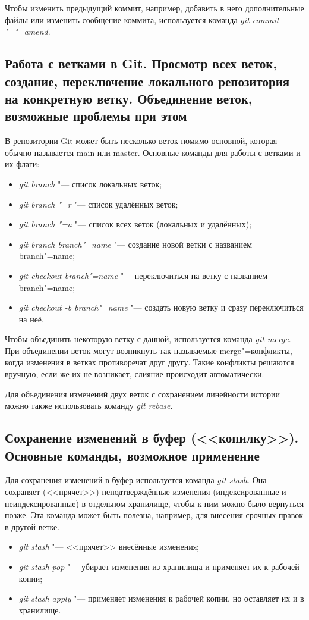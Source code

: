 \documentclass[12pt]{article}
\begin{document}
Чтобы изменить предыдущий коммит, например, добавить в него дополнительные файлы или изменить сообщение коммита, используется команда \textit{git commit "="=amend}.

\subsection{Работа с ветками в Git. Просмотр всех веток, создание, переключение локального репозитория на конкретную ветку. Объединение веток, возможные проблемы при этом}
В репозитории Git может быть несколько веток помимо основной, которая обычно называется main или master. Основные команды для работы с ветками и их флаги:
\begin{itemize}
\item \textit{git branch} "--- список локальных веток;
\item \textit{git branch "=r} "--- список удалённых веток;
\item \textit{git branch "=a} "--- список всех веток (локальных и удалённых);
\item \textit{git branch branch"=name} "--- создание новой ветки с названием branch"=name;
\item \textit{git checkout branch"=name} "--- переключиться на ветку с названием branch"=name;
\item \textit{git checkout -b branch"=name} "--- создать новую ветку и сразу переключиться на неё.
\end{itemize}

Чтобы объединить некоторую ветку с данной, используется команда \textit{git merge}. При объединении веток могут возникнуть так называемые merge"=конфликты, когда изменения в ветках противоречат друг другу. Такие конфликты решаются вручную, если же их не возникает, слияние происходит автоматически.

Для объединения изменений двух веток с сохранением линейности истории можно также использовать команду \textit{git rebase}.

\subsection{Сохранение изменений в буфер (<<копилку>>). Основные команды, возможное применение}
Для сохранения изменений в буфер используется команда \textit{git stash}. Она сохраняет (<<прячет>>) неподтверждённые изменения (индексированные и неиндексированные) в отдельном хранилище, чтобы к ним можно было вернуться позже. Эта команда может быть полезна, например, для внесения срочных правок в другой ветке.
\begin{itemize}
\item \textit{git stash} "--- <<прячет>> внесённые изменения;
\item \textit{git stash pop} "--- убирает изменения из хранилища и применяет их к рабочей копии;
\item \textit{git stash apply} "--- применяет изменения к рабочей копии, но оставляет их и в хранилище.
\end{itemize}
\end{document}
